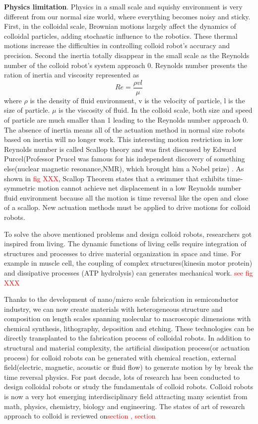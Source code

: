\textbf{Physics limitation}. Physics in a small scale and squishy  environment is very different from our normal size world, where everything becomes noisy and sticky. First, in the colloidal scale, Brownian motions largely affect the dynamics of colloidal particles, adding stochastic influence to the robotics. These thermal motions increase the difficulties in controlling colloid robot's accuracy and precision. Second the inertia totally disappear in the small scale as the Reynolds number of the colloid robot's system approach 0.  Reynolds number presents the ration of inertia and viscosity represented as
\begin{equation}
    Re=\frac{\rho v l}{\mu}
\end{equation}
where $\rho $ is the density of fluid environment, v is the velocity of particle, l is the size of particle. $\mu$ is the  viscosity of fluid. In the colloid scale, both size and speed of particle are much smaller than 1 leading to the Reynolds number approach 0. The absence of inertia means all of the actuation method in normal size robots based on inertia will no longer work. This interesting  motion restriction in low Reynolds number is called Scallop
theory and was first discussed by Edward Purcel(Professor Prucel was famous for his independent discovery of something else(nuclear magnetic resonance,NMR), which brought him a Nobel prize) \cite{purcell1977life}. As shown in \textcolor{red}{fig XXX},  Scallop Theorem states that a swimmer that exhibits time-symmetric motion cannot achieve net displacement in a low Reynolds number fluid environment because all the motion is time reversal like the open and close of a scallop. New actuation methods must be applied to drive motions for colloid robots.

To solve the above mentioned problems and design colloid robots, researchers got inspired from living. The dynamic functions of living cells require integration of structures and processes to drive material organization in space and time. For example in muscle cell,  the coupling of complex structures(kinesin motor protein) and dissipative processes (ATP hydrolysis) can generates mechanical work. \textcolor{red}{see fig XXX}

Thanks to the development of nano/micro scale fabrication in semiconductor industry, we can now create materials with heterogeneous structure and composition on length scales spanning molecular to macroscopic dimensions with chemical synthesis, lithography, deposition and etching. These technologies can be directly transplanted to the fabrication process of colloidal robots. In addition to structural and material complexity, the artificial dissipation process(or actuation process) for colloid robots  can be generated  with chemical reaction, external field(electric, magnetic, acoustic or fluid flow) to generate motion by by break the time reversal physics. For past decade, lots of research has been conducted to design colloidal robots or study the fundamentals of colloid robots. Colloid robots is now a very hot emerging interdisciplinary field attracting many scientist from math, physics, chemistry, biology and engineering. The states of art of  research approach to colloid is reviewed on\textcolor{red}{section , section }

